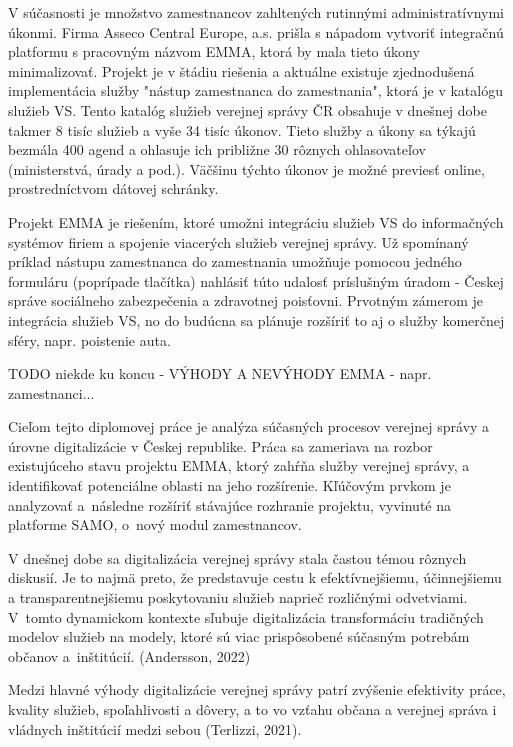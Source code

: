 \startthesis
\startbodymatter

V súčasnosti je množstvo zamestnancov zahltených rutinnými administratívnymi úkonmi. Firma Asseco Central Europe, a.s. prišla s nápadom vytvoriť integračnú platformu s pracovným názvom EMMA, ktorá by mala tieto úkony minimalizovať. Projekt je v štádiu riešenia a aktuálne existuje zjednodušená implementácia služby "nástup zamestnanca do zamestnania", ktorá je v katalógu služieb VS. Tento katalóg služieb verejnej správy ČR obsahuje v dnešnej dobe takmer 8 tisíc služieb a vyše 34 tisíc úkonov.  Tieto služby a úkony sa týkajú bezmála 400 agend a ohlasuje ich približne 30 rôznych ohlasovateľov (ministerstvá, úrady a pod.). Väčšinu týchto úkonov je možné previesť online, prostredníctvom dátovej schránky. 

Projekt EMMA je riešením, ktoré umožni integráciu služieb VS do informačných systémov firiem a spojenie viacerých služieb verejnej správy. Už spomínaný príklad nástupu zamestnanca do zamestnania umožňuje pomocou jedného formuláru (poprípade tlačítka) nahlásiť túto udalosť príslušným úradom - Českej správe sociálneho zabezpečenia a zdravotnej poisťovni. Prvotným zámerom je integrácia služieb VS, no do budúcna sa plánuje rozšíriť to aj o služby komerčnej sféry, napr. poistenie auta. 

\TODO
TODO niekde ku koncu - VÝHODY A NEVÝHODY EMMA - napr. zamestnanci...

Cieľom tejto diplomovej práce je analýza súčasných procesov verejnej správy a úrovne digitalizácie v Českej republike. Práca sa zameriava na rozbor existujúceho stavu projektu EMMA, ktorý zahŕňa služby verejnej správy, a identifikovať potenciálne oblasti na jeho rozšírenie. Kľúčovým prvkom je analyzovať a~následne rozšíriť stávajúce rozhranie projektu, vyvinuté na platforme SAMO, o~nový modul zamestnancov. 

V dnešnej dobe sa digitalizácia verejnej správy stala častou témou rôznych diskusií. Je to najmä preto, že predstavuje cestu k efektívnejšiemu, účinnejšiemu a transparentnejšiemu poskytovaniu služieb naprieč rozličnými odvetviami. \zlom V~tomto dynamickom kontexte sľubuje digitalizácia transformáciu tradičných modelov služieb na modely, ktoré sú viac prispôsobené súčasným potrebám občanov a~inštitúcií. \scr(Andersson, 2022)

Medzi hlavné výhody digitalizácie verejnej správy patrí zvýšenie efektivity práce, kvality služieb, spoľahlivosti a dôvery, a to vo vzťahu občana a verejnej správa i vládnych inštitúcií medzi sebou \scr(Terlizzi, 2021).

